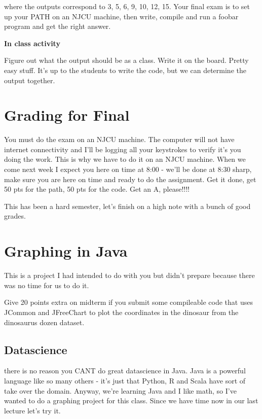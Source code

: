 \documentclass[12pt]{article}
\begin{document}
 where the outputs correspond to 3, 5, 6, 9, 10, 12, 15. Your final exam is to
set up your PATH on an NJCU machine, then write, compile and run a foobar
program and get the right answer.

{\LARGE\textbf{In class activity}}

\begin{center}
{\LARGE Figure out what the output should be as a class. Write it on the board.
Pretty easy stuff. It's up to the students to write the code, but we can
determine the output together. }
\end{center}

\section{Grading for Final}
You must do the exam on an NJCU machine. The computer will not have internet
connectivity and I'll be logging all your keystrokes to verify it's you doing
the work. This is why we have to do it on an NJCU machine. When we come next
week I expect you here on time at 8:00 - we'll be done at 8:30 sharp, make sure
you are here on time and ready to do the assignment. Get it done, get 50 pts for
the path, 50 pts for the code. Get an A, please!!!!

This has been a hard semester, let's finish on a high note with a bunch of good
grades.

\section{Graphing in Java}
This is a project I had intended to do with you but didn't prepare because there
was no time for us to do it. 

Give 20 points extra on midterm if you submit some compileable code that uses
JCommon and JFreeChart to plot the coordinates in the dinosaur from the
dinosaurus dozen dataset.
\subsection{Datascience}
there is no reason you CANT do great datascience in Java. Java is a powerful
language like so many others - it's just that Python, R and Scala have sort of
take over the domain. Anyway, we're learning Java and I like math, so I've
wanted to do a graphing project for this class. Since we have time now in our
last lecture let's try it.
\end{document}
